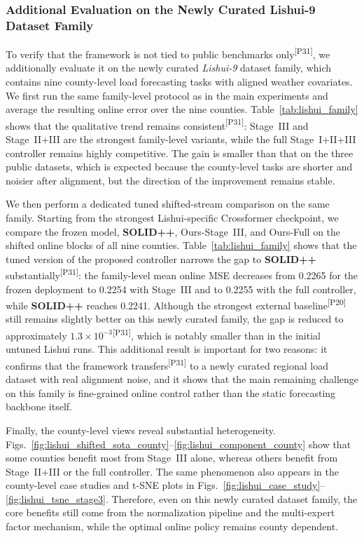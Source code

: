 ﻿\documentclass[journal]{IEEEtran}
\DeclareRobustCommand{\auditbad}[2]{{\color{auditred}#1}{\color{auditred}\textsuperscript{[#2]}}}
\begin{document}
\subsubsection{Additional Evaluation on the Newly Curated Lishui-9 Dataset Family}
To \auditbad{verify that the framework is not tied to public benchmarks only}{P31}, we additionally evaluate it on the newly curated \textit{Lishui-9} dataset family, which contains nine county-level load forecasting tasks with aligned weather covariates. We first run the same family-level protocol as in the main experiments and average the resulting online error over the nine counties. Table~\ref{tab:lishui_family} shows that the qualitative trend remains \auditbad{consistent}{P31}: Stage~III and Stage~II+III are the strongest family-level variants, while the full Stage~I+II+III controller remains highly competitive. The gain is smaller than that on the three public datasets, which is expected because the county-level tasks are shorter and noisier after alignment, but the direction of the improvement remains stable.

We then perform a dedicated tuned shifted-stream comparison on the same family. Starting from the strongest Lishui-specific Crossformer checkpoint, we compare the frozen model, \textbf{SOLID++}, Ours-Stage~III, and Ours-Full on the shifted online blocks of all nine counties. Table~\ref{tab:lishui_family} shows that the tuned version of the proposed controller narrows the gap to \textbf{SOLID++} \auditbad{substantially}{P31}: the family-level mean online MSE decreases from 0.2265 for the frozen deployment to 0.2254 with Stage~III and to 0.2255 with the full controller, while \textbf{SOLID++} reaches 0.2241. Although the \auditbad{strongest external baseline}{P20} still remains slightly better on this newly curated family, the gap is reduced to approximately \auditbad{$1.3\times 10^{-3}$}{P31}, which is notably smaller than in the initial untuned Lishui runs. This additional result is important for two reasons: it \auditbad{confirms that the framework transfers}{P31} to a newly curated regional load dataset with real alignment noise, and it shows that the main remaining challenge on this family is fine-grained online control rather than the static forecasting backbone itself.

Finally, the county-level views reveal substantial heterogeneity. Figs.~\ref{fig:lishui_shifted_sota_county}--\ref{fig:lishui_component_county} show that some counties benefit most from Stage~III alone, whereas others benefit from Stage~II+III or the full controller. The same phenomenon also appears in the county-level case studies and t-SNE plots in Figs.~\ref{fig:lishui_case_study}--\ref{fig:lishui_tsne_stage3}. Therefore, even on this newly curated dataset family, the core benefits still come from the normalization pipeline and the multi-expert factor mechanism, while the optimal online policy remains county dependent.
\end{document}
